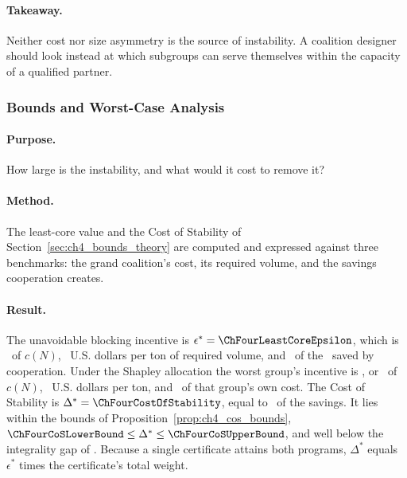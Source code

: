 \begin{table}[htbp]
\centering
\caption{Stability Under Mean-Preserving Changes in Retailer Volume}
\label{tab:ch4_dispersion}
\end{table}

\paragraph{Takeaway.} Neither cost nor size asymmetry is the source of instability. A coalition designer should look instead at which subgroups can serve themselves within the capacity of a qualified partner.

\subsubsection{Bounds and Worst-Case Analysis}

\paragraph{Purpose.} How large is the instability, and what would it cost to remove it?

\paragraph{Method.} The least-core value and the Cost of Stability of Section~\ref{sec:ch4_bounds_theory} are computed and expressed against three benchmarks: the grand coalition's cost, its required volume, and the savings cooperation creates.

\paragraph{Result.} The unavoidable blocking incentive is $\epsilon^*=\ChFourLeastCoreEpsilon$, which is \ChFourEpsilonShareCost\ of $c(N)$, \ChFourEpsilonPerTon\ U.S. dollars per ton of required volume, and \ChFourEpsilonShareSavings\ of the \ChFourGrandSavings\ saved by cooperation. Under the Shapley allocation the worst group's incentive is \ChFourWorstCoalitionGain, or \ChFourMinSlackShareCost\ of $c(N)$, \ChFourMinSlackPerTon\ U.S. dollars per ton, and \ChFourMinSlackShareCoalition\ of that group's own cost. The Cost of Stability is $\Delta^*=\ChFourCostOfStability$, equal to \ChFourCoSShareSavings\ of the savings. It lies within the bounds of Proposition~\ref{prop:ch4_cos_bounds}, $\ChFourCoSLowerBound\leq\Delta^*\leq\ChFourCoSUpperBound$, and well below the integrality gap of \ChFourIntegralityGap. Because a single certificate attains both programs, $\Delta^*$ equals $\epsilon^*$ times the certificate's total weight.

